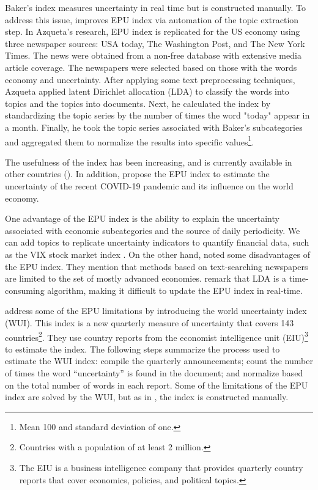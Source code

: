 \documentclass{article}
\begin{document}
Baker's index measures uncertainty in real time but is constructed manually. To address this issue, \cite{Azqueta2017}  improves EPU index via automation of the topic extraction step. In Azqueta's research, EPU index is replicated for the US economy using three newspaper sources: USA today, The Washington Post, and The New York Times. The news were obtained from a non-free database with extensive media article coverage. The newspapers were selected based on those with the words economy and uncertainty. After applying some text preprocessing techniques, Azqueta applied latent Dirichlet allocation (LDA) to classify the words into topics and the topics into documents. Next, he calculated the index by standardizing the topic series by the number of times the word "today" appear in a month. Finally, he took the topic series  associated with Baker's subcategories and aggregated them to normalize the results into specific values\footnote{Mean 100 and standard deviation of one. }.

The usefulness of the index has been increasing, and is currently available in other countries (\cite{Azqueta20201, Azqueta20202}). In addition, \cite{Baker2020} propose  the EPU index to estimate the uncertainty of the recent COVID-19 pandemic and its influence on the world economy. 

One advantage of the EPU index is the ability to explain the uncertainty associated with economic subcategories and the source of daily periodicity. We can add  topics to replicate uncertainty indicators to quantify financial data, such as the VIX stock market index \citep{Azqueta20201, Azqueta20202}. 
On the other hand, \cite{Ahir2020} noted some disadvantages of the EPU index. They mention that methods based on text-searching newspapers are limited to the set of mostly advanced economies. \cite{Azqueta20201} remark that LDA is a time-consuming algorithm, making it difficult to update the EPU index in real-time.

 \cite{Ahir2020}  address some of the EPU limitations by introducing the world uncertainty index (WUI). This index is a new quarterly measure of uncertainty that covers 143 countries\footnote{Countries with a population of at least 2 million.}. They use country reports from the economist intelligence unit (EIU)\footnote{The EIU is a business intelligence company that provides quarterly country reports that cover economics, policies, and political topics.} to estimate the index.  The following steps summarize the process used to estimate the WUI index:  compile the quarterly announcements; count the number of times the word “uncertainty”  is found in the document; and normalize based on the total number of words in each report. Some of the limitations of the EPU index are solved by the WUI, but as in \cite{Baker2016}, the index is constructed manually. 
 
\end{document}
